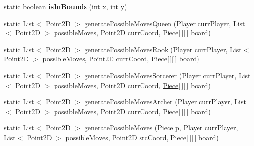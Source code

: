 \begin{DoxyCompactItemize}
\mbox{\label{classcom_1_1chess_1_1model_1_1logic_1_1_move_aa815adb704a64f6c4d706c730abe5b8d}} 
static boolean {\bfseries is\+In\+Bounds} (int x, int y)
\item 
static List$<$ Point2D $>$ \mbox{\hyperlink{classcom_1_1chess_1_1model_1_1logic_1_1_move_ac177bac5fa3d073958a65df6c545fc5a}{generate\+Possible\+Moves\+Queen}} (\mbox{\hyperlink{classcom_1_1chess_1_1model_1_1logic_1_1_player}{Player}} curr\+Player, List$<$ Point2D $>$ possible\+Moves, Point2D curr\+Coord, \mbox{\hyperlink{classcom_1_1chess_1_1model_1_1pieces_1_1_piece}{Piece}}\mbox{[}$\,$\mbox{]}\mbox{[}$\,$\mbox{]} board)
\item 
static List$<$ Point2D $>$ \mbox{\hyperlink{classcom_1_1chess_1_1model_1_1logic_1_1_move_ad4548af895236d81801ca5b5907f99d9}{generate\+Possible\+Moves\+Rook}} (\mbox{\hyperlink{classcom_1_1chess_1_1model_1_1logic_1_1_player}{Player}} curr\+Player, List$<$ Point2D $>$ possible\+Moves, Point2D curr\+Coord, \mbox{\hyperlink{classcom_1_1chess_1_1model_1_1pieces_1_1_piece}{Piece}}\mbox{[}$\,$\mbox{]}\mbox{[}$\,$\mbox{]} board)
\item 
static List$<$ Point2D $>$ \mbox{\hyperlink{classcom_1_1chess_1_1model_1_1logic_1_1_move_a09a4dbf1754dd0dc3901b85cb7efce40}{generate\+Possible\+Moves\+Sorcerer}} (\mbox{\hyperlink{classcom_1_1chess_1_1model_1_1logic_1_1_player}{Player}} curr\+Player, List$<$ Point2D $>$ possible\+Moves, Point2D curr\+Coord, \mbox{\hyperlink{classcom_1_1chess_1_1model_1_1pieces_1_1_piece}{Piece}}\mbox{[}$\,$\mbox{]}\mbox{[}$\,$\mbox{]} board)
\item 
static List$<$ Point2D $>$ \mbox{\hyperlink{classcom_1_1chess_1_1model_1_1logic_1_1_move_a43ae52bf9f9fec5bcaf3b3e22caa154c}{generate\+Possible\+Moves\+Archer}} (\mbox{\hyperlink{classcom_1_1chess_1_1model_1_1logic_1_1_player}{Player}} curr\+Player, List$<$ Point2D $>$ possible\+Moves, Point2D curr\+Coord, \mbox{\hyperlink{classcom_1_1chess_1_1model_1_1pieces_1_1_piece}{Piece}}\mbox{[}$\,$\mbox{]}\mbox{[}$\,$\mbox{]} board)
\item 
static List$<$ Point2D $>$ \mbox{\hyperlink{classcom_1_1chess_1_1model_1_1logic_1_1_move_a95f7268a78a5ca337284d92e6a4293ff}{generate\+Possible\+Moves}} (\mbox{\hyperlink{classcom_1_1chess_1_1model_1_1pieces_1_1_piece}{Piece}} p, \mbox{\hyperlink{classcom_1_1chess_1_1model_1_1logic_1_1_player}{Player}} curr\+Player, List$<$ Point2D $>$ possible\+Moves, Point2D src\+Coord, \mbox{\hyperlink{classcom_1_1chess_1_1model_1_1pieces_1_1_piece}{Piece}}\mbox{[}$\,$\mbox{]}\mbox{[}$\,$\mbox{]} board)
\end{DoxyCompactItemize}



